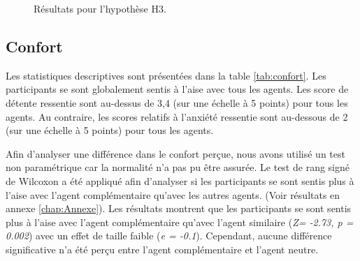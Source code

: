 	\begin{figure}[!tbh]
		
		
		
		\caption{Résultats pour l'hypothèse H3.}
		\label{fig:tour}
	\end{figure}
	
	
	\subsection{Confort}
	
	Les statistiques descriptives sont présentées dans la table \ref{tab:confort}. Les participants se sont globalement sentis à l'aise avec tous les agents.
	Les score de détente ressentie sont au-dessus de 3,4 (sur une échelle à 5 points) pour tous les agents. Au contraire, les scores relatifs à l'anxiété  ressentie sont au-dessous de 2 (sur une échelle à 5 points) pour tous les agents. 
	
	Afin d'analyser une différence dans le confort perçue, nous avons utilisé un test non paramétrique car la normalité n'a pas pu être assurée. Le test de rang signé de Wilcoxon a été appliqué afin d'analyser si les participants se sont sentis plus à l'aise avec l'agent complémentaire qu'avec les autres agents. (Voir résultats en annexe \ref{chap:Annexe}). 
	Les résultats montrent que les participants se sont sentis plus à l'aise avec l'agent complémentaire qu'avec l'agent similaire (\emph{Z= -2.73, p = 0.002})
	avec un effet de taille faible (\emph{e = -0.1}). Cependant, aucune différence significative n'a été perçu entre l'agent complémentaire et l'agent neutre. 
	
